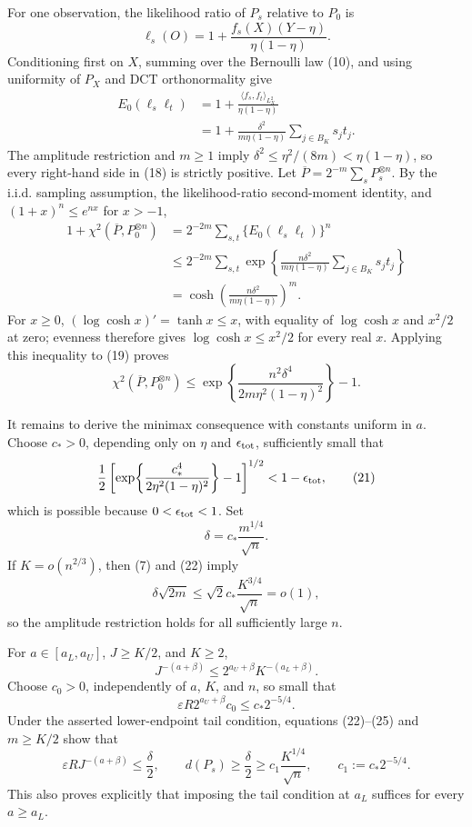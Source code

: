 For one observation, the likelihood ratio of \(P_s\) relative to \(P_0\) is
\[
 \ell_s(O)=1+\frac{f_s(X)(Y-\eta)}{\eta(1-\eta)}.
 \tag{17}
\]
Conditioning first on \(X\), summing over the Bernoulli law (10), and using uniformity of \(P_X\) and DCT orthonormality give
\[
 \begin{aligned}
 E_0(\ell_s\ell_t)
 &=1+\frac{\langle f_s,f_t\rangle_{L^2_X}}{\eta(1-\eta)} \\
 &=1+\frac{\delta^2}{m\eta(1-\eta)}
       \sum_{j\in B_K}s_jt_j.
 \end{aligned}
 \tag{18}
\]
The amplitude restriction and \(m\geq1\) imply
\(\delta^2\leq\eta^2/(8m)<\eta(1-\eta)\), so every right-hand side in (18) is strictly positive.  Let
\(\overline P=2^{-m}\sum_sP_s^{\otimes n}\).  By the i.i.d. sampling assumption, the likelihood-ratio second-moment identity, and \((1+x)^n\leq e^{nx}\) for \(x>-1\),
\[
 \begin{aligned}
 1+\chi^2(\overline P,P_0^{\otimes n})
 &=2^{-2m}\sum_{s,t}\{E_0(\ell_s\ell_t)\}^n \\
 &\leq 2^{-2m}\sum_{s,t}
   \exp\!\left\{
    \frac{n\delta^2}{m\eta(1-\eta)}
    \sum_{j\in B_K}s_jt_j
   \right\} \\
 &=\cosh\!\left(\frac{n\delta^2}{m\eta(1-\eta)}\right)^m.
 \end{aligned}
 \tag{19}
\]
For \(x\geq0\), \((\log\cosh x)'=\tanh x\leq x\), with equality of \(\log\cosh x\) and \(x^2/2\) at zero; evenness therefore gives \(\log\cosh x\leq x^2/2\) for every real \(x\).  Applying this inequality to (19) proves
\[
 \chi^2(\overline P,P_0^{\otimes n})
 \leq
 \exp\!\left\{\frac{n^2\delta^4}
 {2m\eta^2(1-\eta)^2}\right\}-1.
 \tag{20}
\]

It remains to derive the minimax consequence with constants uniform in \(a\).  Choose \(c_*>0\), depending only on \(\eta\) and \(\epsilon_{\rm tot}\), sufficiently small that
\[
 \frac12\left[
  \exp\!\left\{\frac{c_*^4}{2\eta^2(1-\eta)^2}\right\}-1
 \right]^{1/2}<1-\epsilon_{\rm tot},
 \tag{21}
\]
which is possible because \(0<\epsilon_{\rm tot}<1\).  Set
\[
 \delta=c_*\frac{m^{1/4}}{\sqrt n}.
 \tag{22}
\]
If \(K=o(n^{2/3})\), then (7) and (22) imply
\[
 \delta\sqrt{2m}
 \leq \sqrt2c_*\frac{K^{3/4}}{\sqrt n}=o(1),
 \tag{23}
\]
so the amplitude restriction holds for all sufficiently large \(n\).

For \(a\in[a_L,a_U]\), \(J\geq K/2\), and \(K\geq2\),
\[
 J^{-(a+\beta)}
 \leq 2^{a_U+\beta}K^{-(a_L+\beta)}.
 \tag{24}
\]
Choose \(c_0>0\), independently of \(a\), \(K\), and \(n\), so small that
\[
 \varepsilon R2^{a_U+\beta}c_0
 \leq c_*2^{-5/4}.
 \tag{25}
\]
Under the asserted lower-endpoint tail condition, equations (22)--(25) and \(m\geq K/2\) show that
\[
 \varepsilon RJ^{-(a+\beta)}
 \leq\frac\delta2,
 \qquad
 d(P_s)\geq\frac\delta2
 \geq c_1\frac{K^{1/4}}{\sqrt n},
 \qquad
 c_1:=c_*2^{-5/4}.
 \tag{26}
\]
This also proves explicitly that imposing the tail condition at \(a_L\) suffices for every \(a\geq a_L\).

